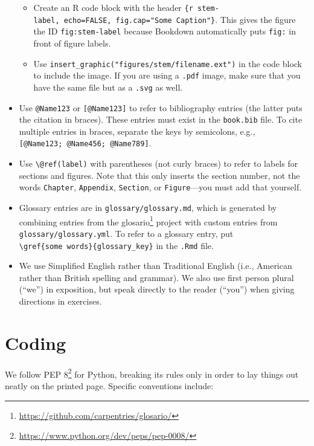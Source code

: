 \documentclass[
]{krantz}
\providecommand{\tightlist}{%
  \setlength{\itemsep}{0pt}\setlength{\parskip}{0pt}}
\renewcommand{\href}[2]{#2\footnote{\url{#1}}}
\begin{document}
\begin{itemize}
  \begin{itemize}
  \tightlist
  \item
    Create an R code block with the header \texttt{\{r\ stem-label,\ echo=FALSE,\ fig.cap="Some\ Caption"\}}.
    This gives the figure the ID \texttt{fig:stem-label} because Bookdown
    automatically puts \texttt{fig:} in front of figure labels.
  \item
    Use \texttt{insert\_graphic("figures/stem/filename.ext")} in the code block to
    include the image. If you are using a \texttt{.pdf} image, make sure that you
    have the same file but as a \texttt{.svg} as well.
  \end{itemize}
\item
  Use \texttt{@Name123} or \texttt{{[}@Name123{]}} to refer to bibliography entries
  (the latter puts the citation in braces).
  These entries must exist in the \texttt{book.bib} file.
  To cite multiple entries in braces,
  separate the keys by semicolons, e.g., \texttt{{[}@Name123;\ @Name456;\ @Name789{]}}.
\item
  Use \texttt{\textbackslash{}@ref(label)} with parentheses (not curly braces) to refer to labels
  for sections and figures. Note that this only inserts the section number,
  not the words \texttt{Chapter}, \texttt{Appendix}, \texttt{Section}, or \texttt{Figure}---you must add
  that yourself.
\item
  Glossary entries are in \texttt{glossary/glossary.md}, which is generated by
  combining entries from the
  \href{https://github.com/carpentries/glosario/}{glosario} project with custom
  entries from \texttt{glossary/glossary.yml}. To refer to a glossary entry, put
  \texttt{\textbackslash{}gref\{some\ words\}\{glossary\_key\}} in the \texttt{.Rmd} file.
\item
  We use Simplified English rather than Traditional English (i.e., American
  rather than British spelling and grammar). We also use first person plural
  (``we'') in exposition, but speak directly to the reader (``you'') when giving
  directions in exercises.
\end{itemize}

\hypertarget{coding}{%
\section*{Coding}\label{coding}}


We follow \href{https://www.python.org/dev/peps/pep-0008/}{PEP 8} for Python,
breaking its rules only in order to lay things out neatly on the printed page.
Specific conventions include:
\end{document}
